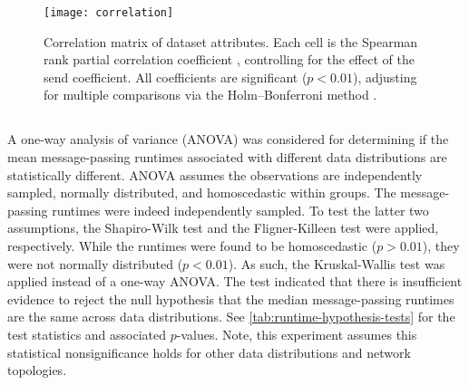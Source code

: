 \begin{figure}[tbp]
  \centering
  \texttt{[image: correlation]}
  \caption[Correlation matrix of  dataset attributes]{Correlation matrix of  dataset attributes. Each cell is the Spearman rank partial correlation coefficient \citep{Spearman1904}, controlling for the effect of the send coefficient. All coefficients are significant ($p < 0.01$), adjusting for multiple comparisons via the Holm–Bonferroni method \citep{Holm1979}.}
  \label{fig:correlation-matrix}
\end{figure}

\subsection{}\label{sec:runtime-baseline-experiment}

A one-way analysis of variance (ANOVA) was considered for determining if the mean message-passing runtimes associated with different data distributions are statistically different. ANOVA assumes the observations are independently sampled, normally distributed, and homoscedastic within groups. The message-passing runtimes were indeed independently sampled. To test the latter two assumptions, the Shapiro-Wilk test \citep{Shapiro1965} and the Fligner-Killeen test \citep{Fligner1976} were applied, respectively. While the runtimes were found to be homoscedastic ($p > \num{0.01}$), they were not normally distributed ($p < \num{0.01}$). As such, the Kruskal-Wallis test was applied instead of a one-way ANOVA. The test indicated that there is insufficient evidence to reject the null hypothesis that the median message-passing runtimes are the same across data distributions. See \cref{tab:runtime-hypothesis-tests} for the test statistics and associated $p$-values. Note, this experiment assumes this statistical nonsignificance holds for other data distributions and network topologies.

